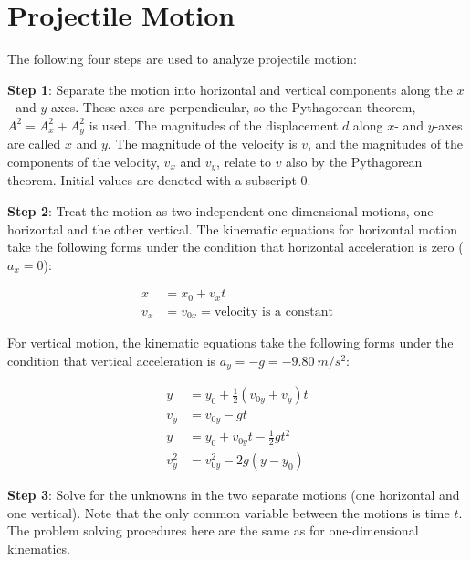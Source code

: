 \documentclass{article}
\begin{document}
\clearpage
\printnoidxglossaries


\clearpage

\section{Projectile Motion}

The following four steps are used to analyze projectile motion:

\vspace{1em}

\textbf{Step 1}: Separate the motion into horizontal and vertical components along the $x$- and $y$-axes. These axes are perpendicular, so the Pythagorean theorem, $A^2 = A_x^2 + A_y^2$ is used. The magnitudes of the displacement $d$ along $x$- and $y$-axes are called $x$ and  $y$. The magnitude of the velocity is $v$, and the magnitudes of the components of the velocity, $v_x$ and $v_y$, relate to $v$ also by the Pythagorean theorem. Initial values are denoted with a subscript 0.

\vspace{1em}

\textbf{Step 2}: Treat the motion as two independent one dimensional motions, one horizontal and the other vertical. The kinematic equations for horizontal motion take the following forms under the condition that horizontal acceleration is zero ($a_x = 0$):

\begin{align}
    x &= x_0 + v_x t \label{7fMAPG}\\[0.5ex]
    v_x &= v_{0x} = \text{velocity is a constant} \label{dCvDf4}
\end{align}

For vertical motion, the kinematic equations take the following forms under the condition that vertical acceleration is $a_y = -g = \SI{-9.80}{m/s^2}$:

\begin{align}
    y &= y_0 + \frac{1}{2}\left(v_{0y} + v_y\right)t\\[0.5ex]
    v_y &= v_{0y} - gt \label{SjYaoE} \\[0.5ex]
    y &= y_0 + v_{0y}t - \frac{1}{2}  g t^2  \label{36YuvF} \\[0.5ex]
    v_y^2 &= v_{0y}^2 - 2 g (y - y_0) \label{wROSXN}
\end{align}

\vspace{1em}

\textbf{Step 3}: Solve for the unknowns in the two separate motions (one horizontal and one vertical). Note that the only common variable between the motions is time $t$. The problem solving procedures here are the same as for one-dimensional kinematics.
\end{document}
